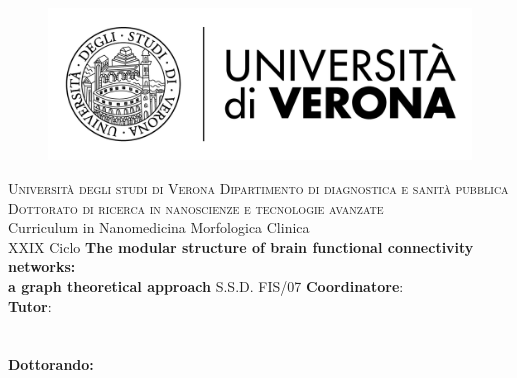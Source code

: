 
\begin{titlepage}
    \begin{figure}[!h]
    \flushleft
	\includegraphics[width=0.25\columnwidth]{images/univr.png}
	\end{figure}

    \begin{center}
    	\large
        \textsc{\large{Università degli studi di Verona}}
        \hfill
        \vfill
		\textsc{\large{Dipartimento di diagnostica e sanità pubblica}}
		\vfill
        \textsc{Dottorato di ricerca in nanoscienze e tecnologie avanzate}\\
        Curriculum in Nanomedicina Morfologica Clinica\\
		XXIX Ciclo
		\vfill
        \begingroup
       		\huge\textbf{
            The modular structure of brain functional connectivity networks:\\a graph theoretical approach
            }
            \bigskip
        \endgroup
        \vfill
        S.S.D. FIS/07
		\flushleft 
		\normalsize{\textbf{Coordinatore}:}\\
		\flushleft
		\normalsize{\textbf{Tutor}:}\\
		\\
		\\
        \flushright
        \normalsize{\textbf{Dottorando:}}\\
        \\	
		
        \vfill

        \vfill

    \end{center}  
\end{titlepage}

